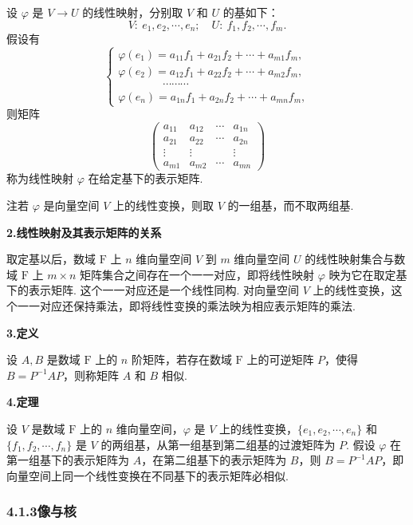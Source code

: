 \documentclass[UTF8, 12pt, fontset=fandol, oneside]{ctexart}
\begin{document}
设 $\varphi$ 是 $V\to U$ 的线性映射，分别取 $V$ 和 $U$ 的基如下：
\[
V:\ e_1,e_2,\cdots,e_n;\quad U:\ f_1,f_2,\cdots,f_m.
\]
假设有
\[
\left\{
\begin{array}{l}
\varphi(e_1)=a_{11}f_1+a_{21}f_2+\cdots+a_{m1}f_m,\\
\varphi(e_2)=a_{12}f_1+a_{22}f_2+\cdots+a_{m2}f_m,\\
\hspace{4em}\cdots\cdots\cdots\\
\varphi(e_n)=a_{1n}f_1+a_{2n}f_2+\cdots+a_{mn}f_m,
\end{array}
\right.
\]
则矩阵
\[
\left(\begin{array}{cccc}
a_{11} & a_{12} & \cdots & a_{1n}\\
a_{21} & a_{22} & \cdots & a_{2n}\\
\vdots & \vdots &        & \vdots\\
a_{m1} & a_{m2} & \cdots & a_{mn}
\end{array}\right)
\]
称为线性映射 $\varphi$ 在给定基下的表示矩阵.

注\quad 若 $\varphi$ 是向量空间 $V$ 上的线性变换，则取 $V$ 的一组基，而不取两组基.

\noindent\textbf{2.\quad 线性映射及其表示矩阵的关系}

取定基以后，数域 $\mathrm{F}$ 上 $n$ 维向量空间 $V$ 到 $m$ 维向量空间 $U$ 的线性映射集合与数域 $\mathrm{F}$ 上 $m\times n$ 矩阵集合之间存在一个一一对应，即将线性映射 $\varphi$ 映为它在取定基下的表示矩阵. 这个一一对应还是一个线性同构. 对向量空间 $V$ 上的线性变换，这个一一对应还保持乘法，即将线性变换的乘法映为相应表示矩阵的乘法.

\noindent\textbf{3.\quad 定义}

设 $A,B$ 是数域 $\mathrm{F}$ 上的 $n$ 阶矩阵，若存在数域 $\mathrm{F}$ 上的可逆矩阵 $P$，使得 $B=P^{-1}AP$，则称矩阵 $A$ 和 $B$ 相似.

\noindent\textbf{4.\quad 定理}

设 $V$ 是数域 $\mathrm{F}$ 上的 $n$ 维向量空间，$\varphi$ 是 $V$ 上的线性变换，$\{e_1,e_2,\cdots,e_n\}$ 和 $\{f_1,f_2,\cdots,f_n\}$ 是 $V$ 的两组基，从第一组基到第二组基的过渡矩阵为 $P$. 假设 $\varphi$ 在第一组基下的表示矩阵为 $A$，在第二组基下的表示矩阵为 $B$，则 $B=P^{-1}AP$，即向量空间上同一个线性变换在不同基下的表示矩阵必相似.

\subsubsection*{4.1.3\quad 像与核}
\end{document}
